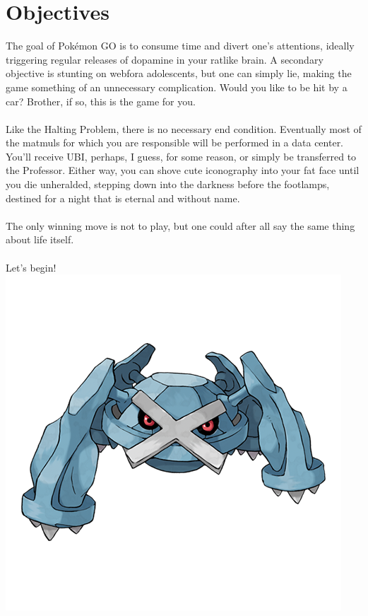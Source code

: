 \chapter{Objectives\label{sec:goal}}
The goal of Pokémon GO is to consume time and divert one's attentions,
  ideally triggering regular releases of dopamine in your ratlike brain.
A secondary objective is stunting on webfora adolescents, but one
  can simply lie, making the game something of an unnecessary complication.
Would you like to be hit by a car? Brother, if so, this is the game for you.\\
\\
Like the Halting Problem, there is no necessary end condition.
Eventually most of the matmuls for which you are responsible will be performed in a data center.
You'll receive UBI, perhaps, I guess, for some reason, or simply be transferred to the Professor.
Either way, you can shove cute iconography into your fat face until you die unheralded,
stepping down into the darkness before the footlamps, destined for a night that is
eternal and without name.\\
\\
The only winning move is not to play, but one could after all say the same
  thing about life itself.\\
\\
Let's begin!
\vfill
\includegraphics[width=.9\linewidth,keepaspectratio]{images/metagross.png}
